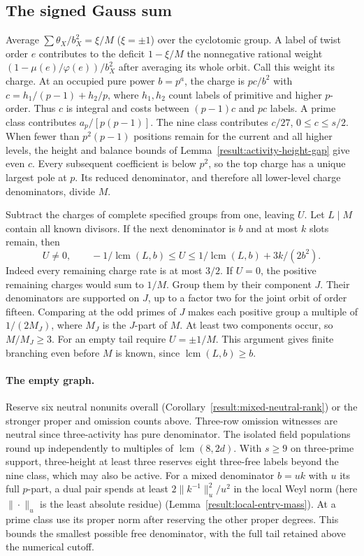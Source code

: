 \documentclass[11pt]{amsart}
\numberwithin{equation}{section}
\theoremstyle{definition}
\theoremstyle{plain}
\DeclareMathOperator{\lcm}{lcm}
\begin{document}
\subsection{The signed Gauss sum}
Average $\sum\theta_X/b_X^2=\xi/M$ ($\xi=\pm1$) over the cyclotomic
group. A label of twist order $e$ contributes to the deficit
$1-\xi/M$ the nonnegative rational weight
$(1-\mu(e)/\varphi(e))/b_X^2$ after averaging its whole orbit. Call
this weight its charge. At an occupied pure power $b=p^a$, the charge
is $pc/b^2$ with $c=h_1/(p-1)+h_2/p$, where $h_1,h_2$ count labels of
primitive and higher $p$-order. Thus $c$ is integral and costs between
$(p-1)c$ and $pc$ labels. A prime class contributes $a_p/[p(p-1)]$.
The nine class contributes $c/27$, $0\le c\le s/2$. When fewer than
$p^2(p-1)$ positions remain for the current and all higher levels, the height and balance bounds of Lemma~\ref{result:activity-height-gap} give even $c$. Every subsequent coefficient is below $p^2$, so the top charge has a unique largest pole at $p$. Its reduced denominator, and therefore all lower-level charge denominators, divide $M$.

Subtract the charges of complete specified groups from one, leaving $U$.
Let $L\mid M$ contain all known divisors. If the next denominator is $b$
and at most $k$ slots remain, then
\begin{equation}\label{eq:odd-deficit-tail}
 U\ne0,\qquad -1/\lcm(L,b)\le U\le1/\lcm(L,b)+3k/(2b^2).
\end{equation}
Indeed every remaining charge rate is at most $3/2$. If $U=0$, the
positive remaining charges would sum to $1/M$. Group them by their
component $J$. Their denominators are supported on $J$, up to a factor
two for the joint orbit of order fifteen. Comparing at the odd primes
of $J$ makes each positive group a multiple of $1/(2M_J)$, where $M_J$
is the $J$-part of $M$. At least two components occur, so $M/M_J\ge3$.
For an empty tail require $U=\pm1/M$. This argument gives finite
branching even before $M$ is known, since $\lcm(L,b)\ge b$.

\paragraph{The empty graph.}

Reserve six neutral nonunits overall (Corollary~\ref{result:mixed-neutral-rank})
or the stronger proper and omission counts above. Three-row omission
witnesses are neutral since three-activity has pure denominator.
The isolated field populations round up independently to multiples of
$\operatorname{lcm}(8,2d)$. With $s\ge9$ on three-prime support, three-height at least three
reserves eight three-free labels beyond the nine class, which may also
be active. For a mixed denominator $b=uk$ with $u$ its full $p$-part,
a dual pair spends at least $2\|k^{-1}\|_u^2/u^2$ in the local Weyl
norm (here $\|\cdot\|_u$ is the least absolute residue) (Lemma~\ref{result:local-entry-mass}). At a prime class use
its proper norm after reserving the other proper degrees. This bounds
the smallest possible free denominator, with the full tail retained
above the numerical cutoff.
\end{document}
